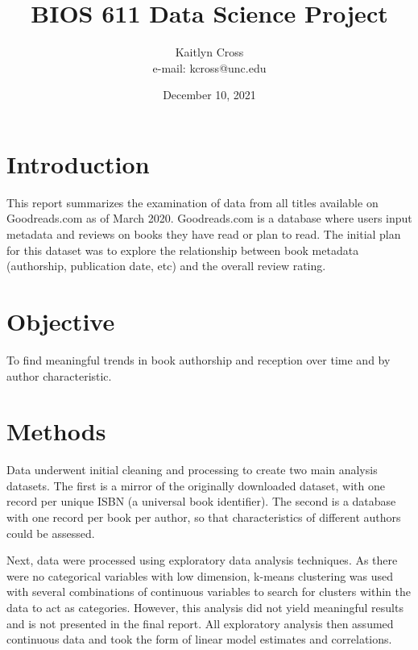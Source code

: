 \documentclass{article}
\begin{document}
\title{BIOS 611 Data Science Project}
\author{Kaitlyn Cross \\ e-mail: kcross@unc.edu}
\date{December 10, 2021}
\maketitle
\setlength{\parskip}{1em}
\section{Introduction}
This report summarizes the examination of data from all titles available on Goodreads.com as of March 2020. Goodreads.com is a database where users input metadata and reviews on books they have read or plan to read. The initial plan for this dataset was to explore the relationship between book metadata (authorship, publication date, etc) and the overall review rating.
\section{Objective}
To find meaningful trends in book authorship and reception over time and by author characteristic.
\section{Methods}
Data underwent initial cleaning and processing to create two main analysis datasets. The first is a mirror of the originally downloaded dataset, with one record per unique ISBN (a universal book identifier). The second is a database with one record per book per author, so that characteristics of different authors could be assessed.

Next, data were processed using exploratory data analysis techniques. As there were no categorical variables with low dimension, k-means clustering was used with several combinations of continuous variables to search for clusters within the data to act as categories. However, this analysis did not yield meaningful results and is not presented in the final report. All exploratory analysis then assumed continuous data and took the form of linear model estimates and correlations.
\end{document}
